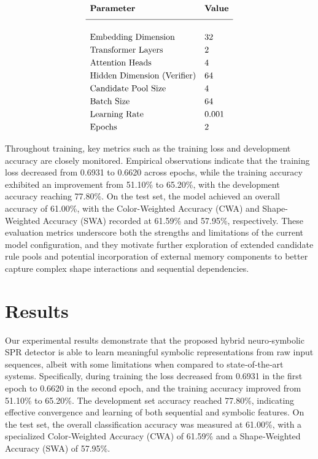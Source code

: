 \documentclass{article}
\begin{document}
\[
\begin{array}{ll}
\textbf{Parameter} & \textbf{Value} \\[6pt]
\hline \\[3pt]
\text{Embedding Dimension} & 32 \\[3pt]
\text{Transformer Layers} & 2 \\[3pt]
\text{Attention Heads} & 4 \\[3pt]
\text{Hidden Dimension (Verifier)} & 64 \\[3pt]
\text{Candidate Pool Size} & 4 \\[3pt]
\text{Batch Size} & 64 \\[3pt]
\text{Learning Rate} & 0.001 \\[3pt]
\text{Epochs} & 2 \\
\end{array}
\]

Throughout training, key metrics such as the training loss and development accuracy are closely monitored. Empirical observations indicate that the training loss decreased from 0.6931 to 0.6620 across epochs, while the training accuracy exhibited an improvement from 51.10\% to 65.20\%, with the development accuracy reaching 77.80\%. On the test set, the model achieved an overall accuracy of 61.00\%, with the Color-Weighted Accuracy (CWA) and Shape-Weighted Accuracy (SWA) recorded at 61.59\% and 57.95\%, respectively. These evaluation metrics underscore both the strengths and limitations of the current model configuration, and they motivate further exploration of extended candidate rule pools and potential incorporation of external memory components to better capture complex shape interactions and sequential dependencies.

\section{Results}
Our experimental results demonstrate that the proposed hybrid neuro‐symbolic SPR detector is able to learn meaningful symbolic representations from raw input sequences, albeit with some limitations when compared to state‐of‐the‐art systems. Specifically, during training the loss decreased from 0.6931 in the first epoch to 0.6620 in the second epoch, and the training accuracy improved from 51.10\% to 65.20\%. The development set accuracy reached 77.80\%, indicating effective convergence and learning of both sequential and symbolic features. On the test set, the overall classification accuracy was measured at 61.00\%, with a specialized Color‐Weighted Accuracy (CWA) of 61.59\% and a Shape‐Weighted Accuracy (SWA) of 57.95\%.
\end{document}
